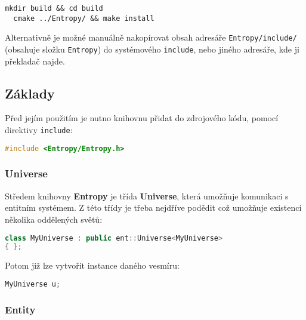 \begin{lstlisting}[basicstyle=\ttfamily]
  mkdir build && cd build
  cmake ../Entropy/ && make install
\end{lstlisting}

\noindent Alternativně je možné manuálně nakopírovat obsah adresáře \texttt{Entropy/include/} (obsahuje složku \texttt{Entropy}) do systémového \texttt{include}, nebo jiného adresáře, kde ji překladač najde.

\subsection*{Základy}

Před jejím použitím je nutno knihovnu přidat do zdrojového kódu, pomocí direktivy \texttt{include}:

\begin{lstlisting}[backgroundcolor = \color{lightgray}, language = C++, xleftmargin = 2cm, framexleftmargin = 1em, tabsize=4]
#include <Entropy/Entropy.h>
\end{lstlisting}

\subsubsection*{Universe}

Středem knihovny \textbf{Entropy} je třída \textbf{Universe}, která umožňuje komunikaci s entitním systémem. Z této třídy je třeba nejdříve podědit což umožňuje existenci několika oddělených světů:

\begin{lstlisting}[backgroundcolor = \color{lightgray}, language = C++, xleftmargin = 2cm, framexleftmargin = 1em, tabsize=4]
class MyUniverse : public ent::Universe<MyUniverse>
{ };
\end{lstlisting}

\noindent Potom již lze vytvořit instance daného vesmíru:

\begin{lstlisting}[backgroundcolor = \color{lightgray}, language = C++, xleftmargin = 2cm, framexleftmargin = 1em, tabsize=4]
MyUniverse u;
\end{lstlisting}

\subsubsection*{Entity}


